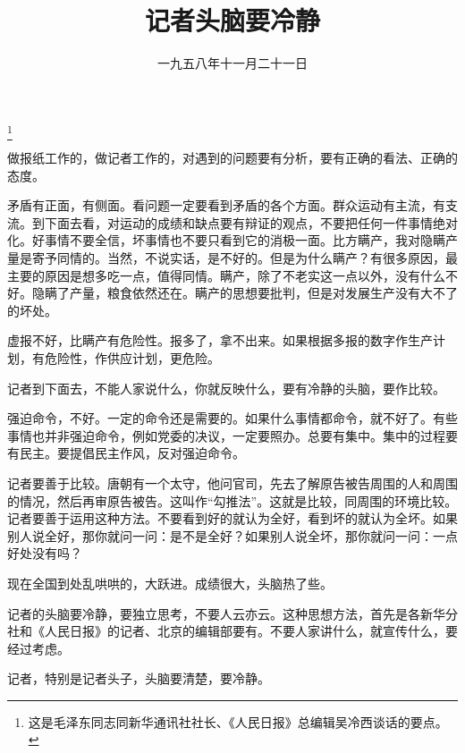 
\title{记者头脑要冷静}
\date{一九五八年十一月二十一日}
\thanks{这是毛泽东同志同新华通讯社社长、《人民日报》总编辑吴冷西谈话的要点。}
\maketitle


做报纸工作的，做记者工作的，对遇到的问题要有分析，要有正确的看法、正确的态度。

矛盾有正面，有侧面。看问题一定要看到矛盾的各个方面。群众运动有主流，有支流。到下面去看，对运动的成绩和缺点要有辩证的观点，不要把任何一件事情绝对化。好事情不要全信，坏事情也不要只看到它的消极一面。比方瞒产，我对隐瞒产量是寄予同情的。当然，不说实话，是不好的。但是为什么瞒产？有很多原因，最主要的原因是想多吃一点，值得同情。瞒产，除了不老实这一点以外，没有什么不好。隐瞒了产量，粮食依然还在。瞒产的思想要批判，但是对发展生产没有大不了的坏处。

虚报不好，比瞒产有危险性。报多了，拿不出来。如果根据多报的数字作生产计划，有危险性，作供应计划，更危险。

记者到下面去，不能人家说什么，你就反映什么，要有冷静的头脑，要作比较。

强迫命令，不好。一定的命令还是需要的。如果什么事情都命令，就不好了。有些事情也并非强迫命令，例如党委的决议，一定要照办。总要有集中。集中的过程要有民主。要提倡民主作风，反对强迫命令。

记者要善于比较。唐朝有一个太守，他问官司，先去了解原告被告周围的人和周围的情况，然后再审原告被告。这叫作“勾推法”。这就是比较，同周围的环境比较。记者要善于运用这种方法。不要看到好的就认为全好，看到坏的就认为全坏。如果别人说全好，那你就问一问：是不是全好？如果别人说全坏，那你就问一问：一点好处没有吗？

现在全国到处乱哄哄的，大跃进。成绩很大，头脑热了些。

记者的头脑要冷静，要独立思考，不要人云亦云。这种思想方法，首先是各新华分社和《人民日报》的记者、北京的编辑部要有。不要人家讲什么，就宣传什么，要经过考虑。

记者，特别是记者头子，头脑要清楚，要冷静。
